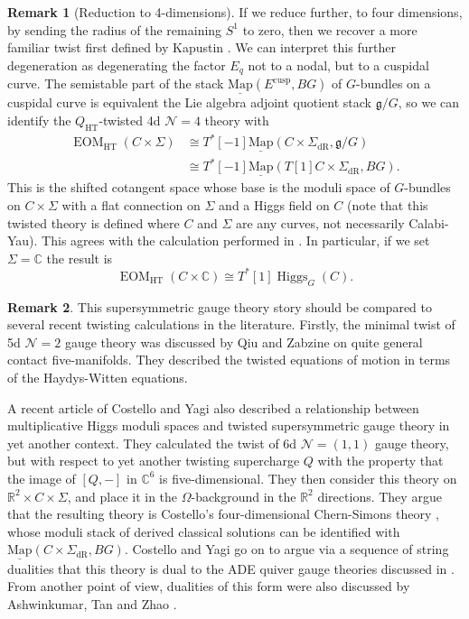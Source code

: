 \documentclass[11pt, oneside, reqno]{amsart}
\theoremstyle{definition} \newtheorem{definition}{Definition}[section]
\theoremstyle{definition} \newtheorem{remark}[definition]{Remark}
\theoremstyle{definition} \newtheorem{remarks}[definition]{Remarks}
\theoremstyle{definition} \newtheorem{question}[definition]{Question}
\theoremstyle{definition} \newtheorem*{note}{Note}
\theoremstyle{definition} \newtheorem{example}[definition]{Example}
\theoremstyle{definition} \newtheorem{examples}[definition]{Examples}
\renewcommand{\gg}{\mathfrak{g}}
\newcommand{\mr}[1]{\mathrm{#1}}
\newcommand{\mc}[1]{\mathcal{#1}}
\newcommand{\ul}[1]{\underline{#1}}
\newcommand{\CC}{\mathbb{C}}
\newcommand{\RR}{\mathbb{R}}
\newcommand{\iso}{\cong}
\DeclareMathOperator{\higgs}{Higgs}
\DeclareMathOperator{\EOM}{EOM}
\newcommand{\map}{\ul{\mr{Map}}}
\newcommand{\HT}{\mr{HT}}
\begin{document}
\begin{remark}[Reduction to 4-dimensions]
If we reduce further, to four dimensions, by sending the radius of the remaining $S^1$ to zero, then we recover a more familiar twist first defined by Kapustin \cite{KapustinHolo}.  We can interpret this further degeneration as degenerating the factor $E_q$ not to a nodal, but to a cuspidal curve.  The semistable part of the stack $\map(E^{\mr{cusp}},BG)$ of $G$-bundles on a cuspidal curve is equivalent the Lie algebra adjoint quotient stack $\gg/G$, so we can identify the $Q_\HT$-twisted 4d $\mc N=4$ theory with
\begin{align*}
\EOM_\HT(C \times \Sigma) &\iso T^*[-1]\map(C \times \Sigma_{\mr{dR}}, \gg/G) \\
&\iso T^*[-1]\map(T[1]C \times \Sigma_{\mr{dR}}, BG).
\end{align*}
This is the shifted cotangent space whose base is the moduli space of $G$-bundles on $C \times \Sigma$ with a flat connection on $\Sigma$ and a Higgs field on $C$ (note that this twisted theory is defined where $C$ and $\Sigma$ are any curves, not necessarily Calabi-Yau).  This agrees with the calculation performed in \cite{ElliottYoo1}.  In particular, if we set $\Sigma = \CC$ the result is
\[\EOM_\HT(C \times \CC) \iso T^*[1]\higgs_G(C).\]
\end{remark}

\begin{remark} \label{Kapustin_twist_remark}
This supersymmetric gauge theory story should be compared to several recent twisting calculations in the literature.  Firstly, the minimal twist of 5d $\mc N=2$ gauge theory was discussed by Qiu and Zabzine \cite{QiuZabzine} on quite general contact five-manifolds.  They described the twisted equations of motion in terms of the Haydys-Witten equations.

A recent article of Costello and Yagi \cite{CostelloYagi} also described a relationship between multiplicative Higgs moduli spaces and twisted supersymmetric gauge theory in yet another context.  They calculated the twist of 6d $\mc N=(1,1)$ gauge theory, but with respect to yet another twisting supercharge $Q$ with the property that the image of $[Q,-]$ in $\CC^6$ is five-dimensional.  They then consider this theory on $\RR^2 \times C \times \Sigma$, and place it in the $\Omega$-background in the $\RR^2$ directions.  They argue that the resulting theory is Costello's four-dimensional Chern-Simons theory \cite{CostelloYangian}, whose moduli stack of derived classical solutions can be identified with $\map(C \times \Sigma_{\mr{dR}}, BG)$.  Costello and Yagi go on to argue via a sequence of string dualities that this theory is dual to the ADE quiver gauge theories discussed in \cite{NekrasovPestun, NekrasovPestunShatashvili}.  From another point of view, dualities of this form were also discussed by Ashwinkumar, Tan and Zhao \cite{AshwinkumarTanZhao}.
\end{remark}
\end{document}
